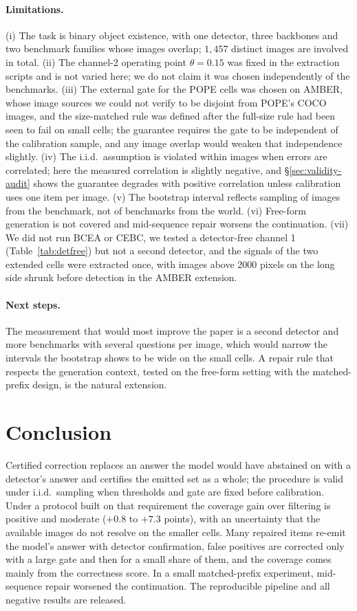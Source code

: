 \paragraph{Limitations.}
(i) The task is binary object existence, with one detector, three backbones and two benchmark families whose
images overlap; $1{,}457$ distinct images are involved in total. (ii) The channel-2 operating point $\theta=0.15$ was fixed
in the extraction scripts and is not varied here; we do not claim it was chosen independently of the benchmarks.
(iii) The external gate for the POPE cells was chosen on AMBER, whose image sources we could not verify to be disjoint from
POPE's COCO images, and the size-matched rule was defined after the full-size rule had been seen to fail on small cells; the guarantee requires the gate to be independent of the calibration sample, and any image overlap
would weaken that independence slightly. (iv) The i.i.d.\ assumption is violated within images when errors are correlated; here the
measured correlation is slightly negative, and \S\ref{sec:validity-audit} shows the guarantee degrades with positive
correlation unless calibration uses one item per image. (v) The bootstrap interval reflects sampling of images from the benchmark, not
of benchmarks from the world. (vi) Free-form generation is not covered and mid-sequence repair worsens the continuation.
(vii) We did not run BCEA or CEBC, we tested a detector-free channel 1 (Table~\ref{tab:detfree}) but not a second detector, and the signals of the two extended cells were extracted once, with images above $2000$ pixels on the long side shrunk before detection in the AMBER extension.

\paragraph{Next steps.}
The measurement that would most improve the paper is a second detector and more benchmarks with several questions per image, which would narrow the
intervals the bootstrap shows to be wide on the small cells. A repair rule that
respects the generation context, tested on the free-form setting with the matched-prefix design, is the natural
extension.

\section{Conclusion}
\label{sec:conclusion}

Certified correction replaces an answer the model would have abstained on with a detector's answer and
certifies the emitted set as a whole; the procedure is valid under i.i.d.\ sampling when thresholds and gate are
fixed before calibration. Under a protocol built on that requirement the coverage gain over filtering is positive and moderate ($+0.8$ to $+7.3$ points), with
an uncertainty that the available images do not resolve on the smaller cells. Many repaired items re-emit the model's answer with detector
confirmation, false positives are corrected only with a large gate and then for a small share of them, and the coverage comes mainly from
the correctness score.
In a small matched-prefix experiment, mid-sequence repair worsened the continuation. The reproducible pipeline and all negative results are released.
